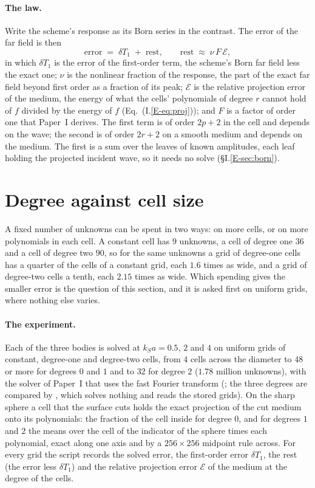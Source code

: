 \documentclass[11pt,a4paper]{article}
\newcommand{\cE}{\mathcal{E}}
\begin{document}
\paragraph{The law.} Write the scheme's response as its Born series in the contrast. The error of the
far field is then
\begin{equation}\label{eq:law}
\text{error}\;=\;\delta T_1\;+\;\text{rest},\qquad \text{rest}\;\approx\;\nu\,F\,\cE ,
\end{equation}
in which $\delta T_1$ is the error of the first-order term, the scheme's Born far field less the exact
one; $\nu$ is the nonlinear fraction of the response, the part of the exact far field beyond first
order as a fraction of its peak; $\cE$ is the relative projection error of the medium, the energy of
what the cells' polynomials of degree $r$ cannot hold of $f$ divided by the energy of $f$
(Eq.~(I.\ref{E-eq:proj})); and $F$ is a factor of order one that Paper~I derives. The first term is of
order $2p+2$ in the cell and depends on the wave; the second is of order $2r+2$ on a smooth medium and
depends on the medium. The first is a sum over the leaves of known amplitudes, each leaf holding the
projected incident wave, so it needs no solve (\S I.\ref{E-sec:born}).

\section{Degree against cell size}\label{sec:degree}

A fixed number of unknowns can be spent in two ways: on more cells, or on more polynomials in each cell.
A constant cell has $9$ unknowns, a cell of degree one $36$ and a cell of degree two $90$, so for the same
unknowns a grid of degree-one cells has a quarter of the cells of a constant grid, each $1.6$ times as
wide, and a grid of degree-two cells a tenth, each $2.15$ times as wide. Which spending gives the smaller
error is the question of this section, and it is asked first on uniform grids, where nothing else varies.

\paragraph{The experiment.} Each of the three bodies is solved at $k_Sa=0.5$, $2$ and $4$ on uniform
grids of constant, degree-one and degree-two cells, from $4$ cells across the diameter to $48$ or more
for degrees $0$ and $1$ and to $32$ for degree $2$ ($1.78$ million unknowns), with the solver of
Paper~I that uses the fast Fourier transform (; the three degrees
are compared by , which solves nothing and reads the stored
grids). On the sharp sphere a cell that the surface cuts holds the exact projection of the cut medium
onto its polynomials: the fraction of the cell inside for degree $0$, and for degrees $1$ and $2$ the
means over the cell of the indicator of the sphere times each polynomial, exact along one axis and by a
$256\times256$ midpoint rule across. For every grid the script records the solved error, the
first-order error $\delta T_1$, the rest (the error less $\delta T_1$) and the relative projection error
$\cE$ of the medium at the degree of the cells.
\end{document}
